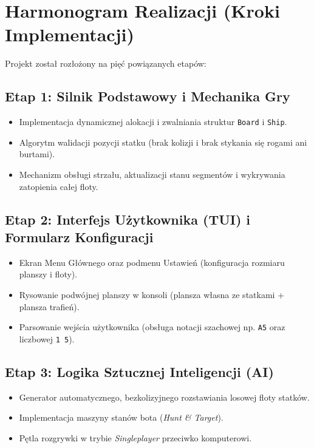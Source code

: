 \documentclass[11pt,a4paper]{article}
\begin{document}
\section{Harmonogram Realizacji (Kroki Implementacji)}
Projekt został rozłożony na pięć powiązanych etapów:

\subsection*{Etap 1: Silnik Podstawowy i Mechanika Gry}
\begin{itemize}[noitemsep]
    \item Implementacja dynamicznej alokacji i zwalniania struktur \texttt{Board} i \texttt{Ship}.
    \item Algorytm walidacji pozycji statku (brak kolizji i brak stykania się rogami ani burtami).
    \item Mechanizm obsługi strzału, aktualizacji stanu segmentów i wykrywania zatopienia całej floty.
\end{itemize}

\subsection*{Etap 2: Interfejs Użytkownika (TUI) i Formularz Konfiguracji}
\begin{itemize}[noitemsep]
    \item Ekran Menu Głównego oraz podmenu Ustawień (konfiguracja rozmiaru planszy i floty).
    \item Rysowanie podwójnej planszy w konsoli (plansza własna ze statkami + plansza trafień).
    \item Parsowanie wejścia użytkownika (obsługa notacji szachowej np. \texttt{A5} oraz liczbowej \texttt{1 5}).
\end{itemize}

\subsection*{Etap 3: Logika Sztucznej Inteligencji (AI)}
\begin{itemize}[noitemsep]
    \item Generator automatycznego, bezkolizyjnego rozstawiania losowej floty statków.
    \item Implementacja maszyny stanów bota (\textit{Hunt \& Target}).
    \item Pętla rozgrywki w trybie \textit{Singleplayer} przeciwko komputerowi.
\end{itemize}
\end{document}

